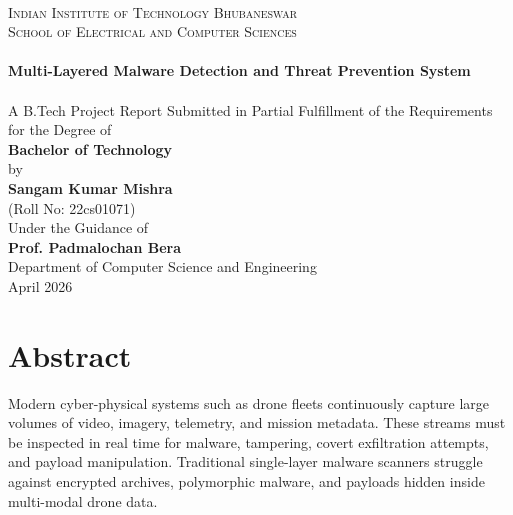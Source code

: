 \documentclass[12pt, a4paper]{report}
\begin{document}
\begin{titlepage}
    \centering
    \vspace*{0.5cm}
    \\[0.8cm]

    {\large \textsc{Indian Institute of Technology Bhubaneswar}}\\[0.25cm]
    {\large \textsc{School of Electrical and Computer Sciences}}\\[1.2cm]

    \hrulefill\\[0.4cm]
    {\bfseries\LARGE Multi-Layered Malware Detection and Threat Prevention System}\\[0.4cm]
    \hrulefill\\[1.2cm]

    {\small A B.Tech Project Report Submitted in Partial Fulfillment of the Requirements for the Degree of}\\[0.3cm]
    {\large \textbf{Bachelor of Technology}}\\[1.0cm]

    {\small by}\\[0.2cm]
    {\large \textbf{Sangam Kumar Mishra}}\\[0.1cm]
    {\small (Roll No: 22cs01071)}\\[1.2cm]

    {\small Under the Guidance of}\\[0.2cm]
    {\large \textbf{Prof. Padmalochan Bera}}\\[0.1cm]
    {\small Department of Computer Science and Engineering}\\[0.5cm]

    {\large April 2026}\\[0.2cm]

    \vspace*{\fill}
\end{titlepage}

\chapter*{Abstract}
\thispagestyle{plain}

Modern cyber-physical systems such as drone fleets continuously capture large
volumes of video, imagery, telemetry, and mission metadata. These streams must
be inspected in real time for malware, tampering, covert exfiltration attempts,
and payload manipulation. Traditional single-layer malware scanners struggle
against encrypted archives, polymorphic malware, and payloads hidden inside
multi-modal drone data.
\end{document}
